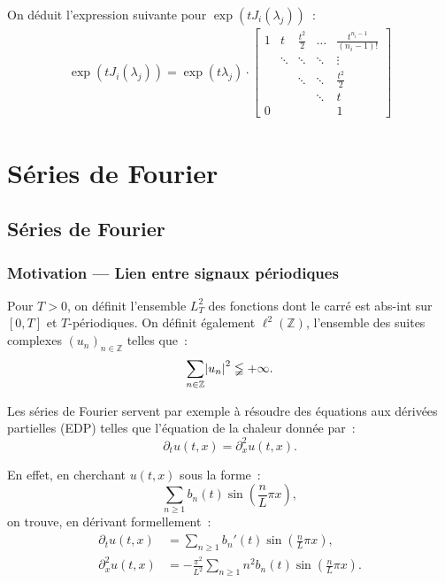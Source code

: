 \documentclass{report}
\theoremstyle{definition}
\theoremstyle{remark}
\numberwithin{equation}{section}
\newcommand{\Z}{\mathbb Z}
\newcommand{\pinfty}{{+\infty}}
\begin{document}
			On déduit l'expression suivante pour $\exp\left(tJ_i(\lambda_j)\right)$~:
			\begin{align}\label{eq:exponentielle bloc Jordan}
				\exp\left(tJ_i(\lambda_j)\right) = \exp(t\lambda_j) \cdot
				\begin{bmatrix}
					1 & t & \frac {t^2}2 & \ldots & \frac {t^{n_i-1}}{(n_i-1)!} \\
					 & \ddots & \ddots & \ddots & \vdots \\
					 & & \ddots & \ddots & \frac {t^2}2 \\
					 & & & \ddots & t \\
					0 & & & & 1
				\end{bmatrix}
			\end{align}




\part{Séries de Fourier}
\chapter{Séries de Fourier}
	\section{Motivation --- Lien entre signaux périodiques}
		Pour $T > 0$, on définit l'ensemble $L^2_T$ des fonctions dont le carré est abs-int sur $[0, T]$ et $T$-périodiques. On définit également $\ell^2(\Z)$,
		l'ensemble des suites complexes $(u_n)_{n \in \Z}$ telles que~:
		\begin{equation}
			\sum_{n \in \Z}\abs {u_n}^2 \lneqq \pinfty.
		\end{equation}

		Les séries de Fourier servent par exemple à résoudre des équations aux dérivées partielles (EDP) telles que l'équation de la chaleur donnée par~:
		\begin{equation}\label{eq:chaleur}
			\partial_tu(t, x) = \partial_x^2u(t, x).
		\end{equation}

		En effet, en cherchant $u(t, x)$ sous la forme~:
		\begin{equation}
			\sum_{n \geq 1}b_n(t)\sin\left(\frac nL\pi x\right),
		\end{equation}
		on trouve, en dérivant formellement~:
		\begin{align}
			\partial_tu(t, x) &= \sum_{n \geq 1}b_n'(t)\sin\left(\frac nL\pi x\right), \\
			\partial_x^2u(t, x) &= -\frac {\pi^2}{L^2}\sum_{n \geq 1}n^2b_n(t)\sin\left(\frac nL\pi x\right).
		\end{align}
\end{document}
